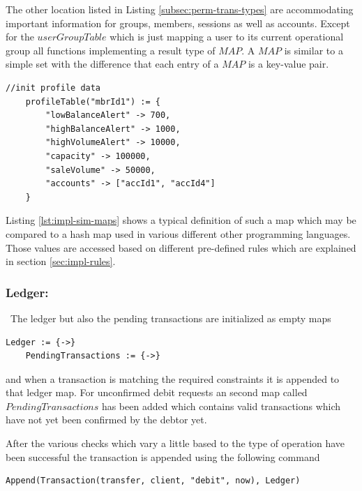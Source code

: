 The other location listed in Listing \ref{subsec:perm-trans-types} are accommodating important information for groups, members, sessions as well as accounts. Except for the $userGroupTable$ which is just mapping a user to its current operational group all functions implementing a result type of $MAP$. A $MAP$ is similar to a simple set with the difference that each entry of a $MAP$ is a key-value pair.

\begin{center}
\begin{minipage}{0.8\textwidth}
\small
\begin{lstlisting}[language=bsl_lst,caption={\bf\small $MAP$ example showing a profile table entry},label={lst:impl-sim-maps} ]
	//init profile data
	profileTable("mbrId1") := {
		"lowBalanceAlert" -> 700,
		"highBalanceAlert" -> 1000,		
		"highVolumeAlert" -> 10000,
		"capacity" -> 100000,
		"saleVolume" -> 50000,
		"accounts" -> ["accId1", "accId4"]
	}
\end{lstlisting}
\end{minipage}
\end{center}

Listing \ref{lst:impl-sim-maps} shows a typical definition of such a map which may be compared to a hash map used in various different other programming languages. Those values are accessed based on different pre-defined rules which are explained in section \ref{sec:impl-rules}.

\subsubsection{Ledger: }\ The ledger but also the pending transactions are initialized as empty maps

\begin{lstlisting}[language=bsl]
	Ledger := {->}
	PendingTransactions := {->}
\end{lstlisting}

and when a transaction is matching the required constraints it is appended to that ledger map. For unconfirmed debit requests an second map called $PendingTransactions$ has been added which contains valid transactions which have not yet been confirmed by the debtor yet.

After the various checks which vary a little based to the type of operation have been successful the transaction is appended using the following command 

\begin{lstlisting}[language=bsl]
	Append(Transaction(transfer, client, "debit", now), Ledger)
\end{lstlisting}

